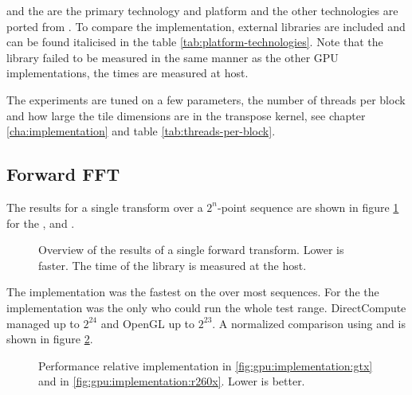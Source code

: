 {\CU} and the {\NVCARD} are the primary technology and platform and the other technologies are ported from {\CU}. To compare the implementation, external libraries are included and can be found italicised in the table \ref{tab:platform-technologies}. Note that the {\CLFFT} library failed to be measured in the same manner as the other GPU implementations, the times are measured at host.

The experiments are tuned on a few parameters, the number of threads per block and how large the tile dimensions are in the transpose kernel, see chapter \ref{cha:implementation} and table \ref{tab:threads-per-block}.

\subsection{Forward FFT}

The results for a single transform over a $2^{n}$-point sequence are shown in figure \ref{fig:gpu:overview} for the {\NVCARD}, {\AMDCARD} and {\INTELCPU}.

\begin{figure}[!htbp]
	\centering
	\subfloat[\NVCARD]{	
		
	}
	\vfill
	\subfloat[\AMDCARD]{
		
	}
	\caption{Overview of the results of a single forward transform. Lower is faster. The time of the {\CLFFT} library is measured at the host.}
	\label{fig:gpu:overview}
\end{figure}

The {\CU} implementation was the fastest on the {\NVCARD} over most sequences. For the {\AMDCARD} the {\OCL} implementation was the only who could run the whole test range. DirectCompute managed up to $2^{24}$ and OpenGL up to $2^{23}$. A normalized comparison using {\CU} and {\OCL} is shown in figure \ref{fig:gpu:implementation}.

\begin{figure}[!htbp]
	\centering
	\subfloat[\NVCARD\label{fig:gpu:implementation:gtx}]{	
		
	}
	\vfill
	\subfloat[\AMDCARD\label{fig:gpu:implementation:r260x}]{
		
	}	
	\caption{Performance relative {\CU} implementation in \ref{fig:gpu:implementation:gtx} and {\OCL} in \ref{fig:gpu:implementation:r260x}. Lower is better.}
	\label{fig:gpu:implementation}
\end{figure}

